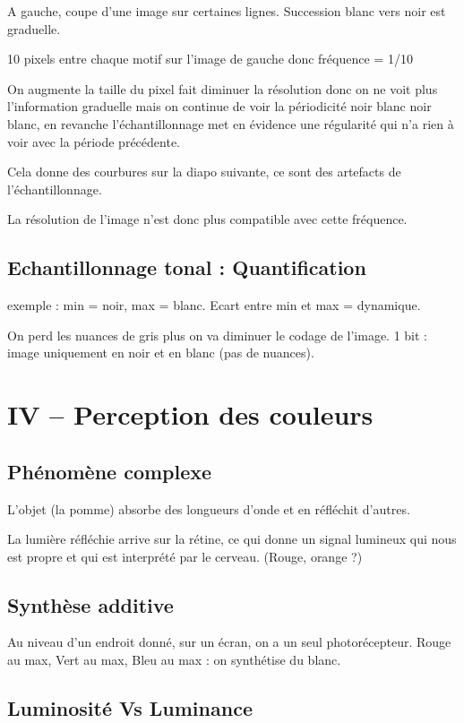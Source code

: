\documentclass{report}
\begin{document}
A gauche, coupe d'une image sur certaines lignes. Succession blanc vers noir est graduelle.

10 pixels entre chaque motif sur l'image de gauche donc fréquence = 1/10

On augmente la taille du pixel fait diminuer la résolution donc on ne voit plus l'information graduelle mais on continue de voir la périodicité noir blanc noir blanc, en revanche l'échantillonnage met en évidence une régularité qui n'a rien à voir avec la période précédente.

Cela donne des courbures sur la diapo suivante, ce sont des artefacts de l'échantillonnage.

La résolution de l'image n'est donc plus compatible avec cette fréquence.

\subsection*{Echantillonnage tonal : Quantification}

exemple : min = noir, max = blanc. Ecart entre min et max = dynamique.

On perd les nuances de gris plus on va diminuer le codage de l'image. 1 bit : image uniquement en noir et en blanc (pas de nuances).

\section*{IV – Perception des couleurs}

\subsection*{Phénomène complexe}

L'objet (la pomme) absorbe des longueurs d'onde et en réfléchit d'autres.

La lumière réfléchie arrive sur la rétine, ce qui donne un signal lumineux qui nous est propre et qui est interprété par le cerveau. (Rouge, orange ?)

\subsection*{Synthèse additive}

Au niveau d'un endroit donné, sur un écran, on a un seul photorécepteur. Rouge au max, Vert au max, Bleu au max : on synthétise du blanc.

\subsection*{Luminosité Vs Luminance}
\end{document}
